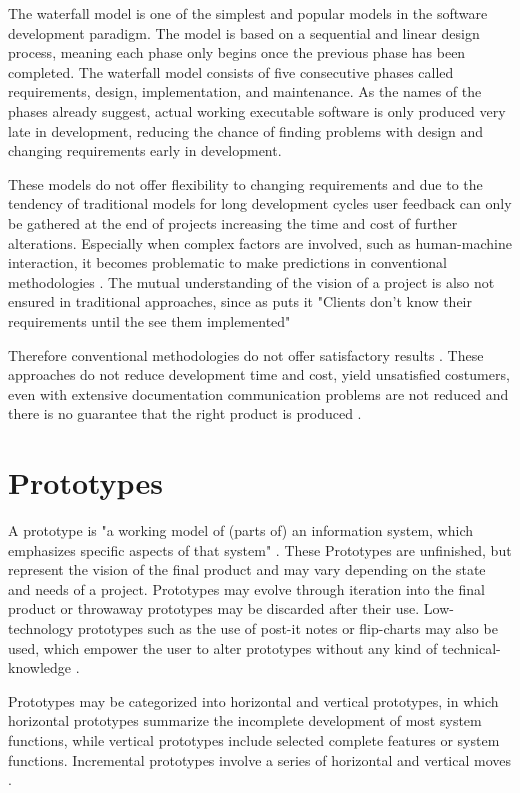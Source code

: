 \documentclass[runningheads]{llncs}
\begin{document}
The waterfall model is one of the simplest and popular models in the software development paradigm. 
The model is based on a sequential and linear design process, meaning each phase only begins once 
the previous phase has been completed. The waterfall model consists of five consecutive phases 
called requirements, design, implementation, and maintenance.
As the names of the phases already suggest, actual working executable software is only produced very
late in development, reducing the chance of finding problems with design and changing requirements
early in development.

These models do not offer flexibility to changing requirements and due to the tendency of 
traditional models for long development cycles user feedback can only be gathered at the end 
of projects \cite{ref_health} increasing the time and cost of further 
alterations. Especially when complex factors are involved, such as human-machine interaction,
it becomes problematic to make predictions in conventional methodologies \cite{ref_RPalternativeStrategy}. 
The mutual understanding of the vision of a project is also not ensured in traditional approaches, 
since as \cite{ref_RPalternativeStrategy}
puts it "Clients don't know their requirements until the see them implemented"

Therefore conventional methodologies do not offer satisfactory results \cite{ref_RPalternativeStrategy}.
These approaches do not reduce development time and cost, yield unsatisfied costumers,
even with extensive documentation communication problems are not reduced and there is 
no guarantee that the right product is produced \cite{ref_RPalternativeStrategy}.

\section{Prototypes}
A prototype is "a working model of (parts of) an information system, 
which emphasizes specific aspects of that system" \cite{ref_prac}. These Prototypes
are unfinished, but represent the vision of the final product and may vary depending 
on the state and needs of a project. Prototypes may evolve through iteration into the final product or
throwaway prototypes may be discarded after their use. Low-technology prototypes such as the use of post-it 
notes or flip-charts may also be used, which empower the user to alter prototypes 
without any kind of technical-knowledge \cite{ref_prac}. 

Prototypes may be categorized into horizontal and vertical prototypes, in which
horizontal prototypes summarize the incomplete development of most system functions,
while vertical prototypes include selected complete features or system functions.
Incremental prototypes involve a series of horizontal and vertical moves \cite{ref_prac}.
\end{document}
